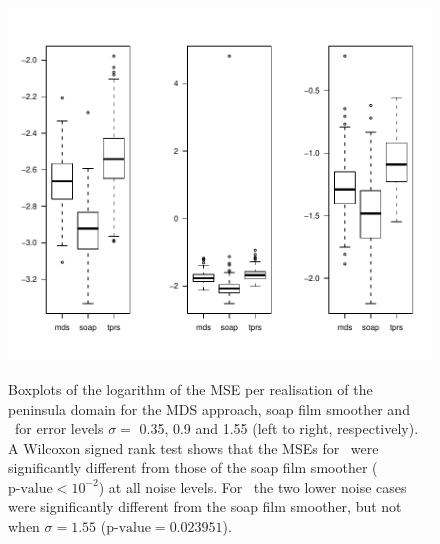 \begin{figure}
\centering
\includegraphics[width=6in, trim=0in 0.5in 0in 0in]{mds/figs/mds-wt2-boxplot.pdf} \\
\caption{Boxplots of the logarithm of the MSE per realisation of the peninsula domain for the MDS approach, soap film smoother and \tprs\ for error levels $\sigma=$ 0.35, 0.9 and 1.55 (left to right, respectively). A Wilcoxon signed rank test shows that the MSEs for \tprs\ were significantly different from those of the soap film smoother ($\text{p-value} < 10^{-2}$) at all noise levels. For \mdsap\ the two lower noise cases were significantly different from the soap film smoother, but not when $\sigma=1.55$ ($\text{p-value} = 0.023951$).}
\label{mds-wt2-boxplot}
\end{figure}

